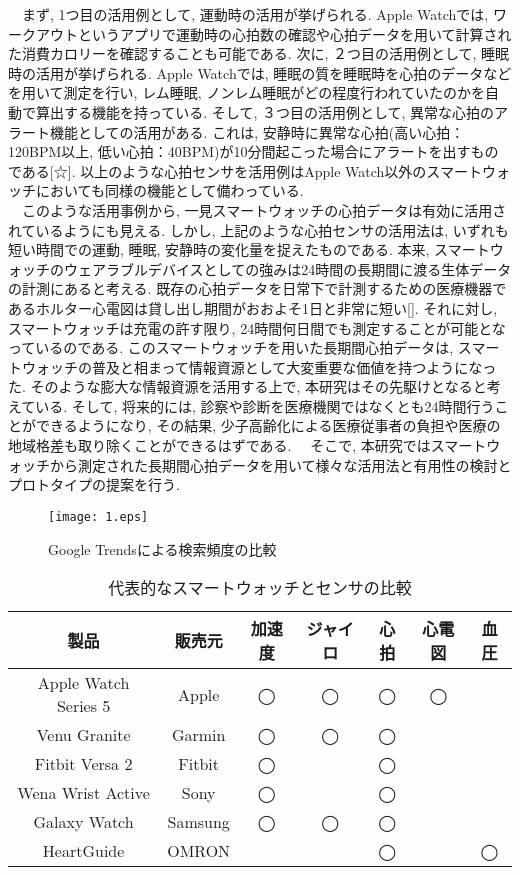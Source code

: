 \documentclass[report, 11pt, a4paper]{jsbook}
\begin{document}
　まず, 1つ目の活用例として, 運動時の活用が挙げられる. Apple Watchでは, ワークアウトというアプリで運動時の心拍数の確認や心拍データを用いて計算された消費カロリーを確認することも可能である. 次に, ２つ目の活用例として, 睡眠時の活用が挙げられる. Apple Watchでは, 睡眠の質を睡眠時を心拍のデータなどを用いて測定を行い, レム睡眠, ノンレム睡眠がどの程度行われていたのかを自動で算出する機能を持っている. そして, ３つ目の活用例として, 異常な心拍のアラート機能としての活用がある. これは, 安静時に異常な心拍(高い心拍：120BPM以上, 低い心拍：40BPM)が10分間起こった場合にアラートを出すものである[☆]. 以上のような心拍センサを活用例はApple Watch以外のスマートウォッチにおいても同様の機能として備わっている. \\
　このような活用事例から, 一見スマートウォッチの心拍データは有効に活用されているようにも見える. しかし, 上記のような心拍センサの活用法は, いずれも短い時間での運動, 睡眠, 安静時の変化量を捉えたものである. 本来, スマートウォッチのウェアラブルデバイスとしての強みは24時間の長期間に渡る生体データの計測にあると考える. 既存の心拍データを日常下で計測するための医療機器であるホルター心電図は貸し出し期間がおおよそ1日と非常に短い[]. それに対し, スマートウォッチは充電の許す限り, 24時間何日間でも測定することが可能となっているのである. このスマートウォッチを用いた長期間心拍データは, スマートウォッチの普及と相まって情報資源として大変重要な価値を持つようになった. そのような膨大な情報資源を活用する上で, 本研究はその先駆けとなると考えている. そして, 将来的には, 診察や診断を医療機関ではなくとも24時間行うことができるようになり, その結果, 少子高齢化による医療従事者の負担や医療の地域格差も取り除くことができるはずである.
　そこで, 本研究ではスマートウォッチから測定された長期間心拍データを用いて様々な活用法と有用性の検討とプロトタイプの提案を行う.  

\begin{figure}[H]
\centering
\texttt{[image: 1.eps]}
\caption{Google Trendsによる検索頻度の比較}
\label{fig:goolge_trends}
\end{figure}


\begin{table}[H]
\centering
\caption{代表的なスマートウォッチとセンサの比較}
\begin{tabular}{ccccccc}
\hline
製品                   & 販売元     & 加速度 & ジャイロ & 心拍 & 心電図 & 血圧 \\ \hline
Apple Watch Series 5 & Apple   & ◯   & ◯    & ◯  & ◯   &    \\
Venu Granite         & Garmin  & ◯   & ◯    & ◯  &     &    \\
Fitbit Versa 2       & Fitbit  & ◯   &      & ◯  &     &    \\
Wena Wrist Active    & Sony    & ◯   &      & ◯  &     &    \\
Galaxy Watch         & Samsung & ◯   & ◯    & ◯  &     &    \\
HeartGuide           & OMRON   &     &      & ◯  &     & ◯  \\ \hline
\end{tabular}
\end{table}
　
\end{document}
